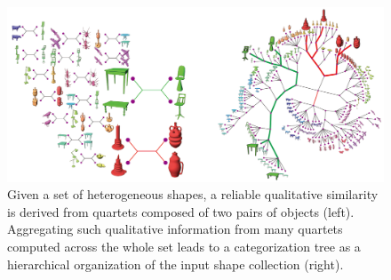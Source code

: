 \begin{figure}[t]
\centering
    \includegraphics[width=1.0\columnwidth]{fig/img/huang_sig12_quartet}
    \caption{Given a set of heterogeneous shapes, a reliable qualitative similarity is derived from quartets composed of two pairs of objects (left).
    Aggregating such qualitative information from many quartets computed across the whole set leads to a categorization tree as a hierarchical
    organization of the input shape collection (right).}
    \label{fig:huang_sig12_quartet}
\end{figure}

